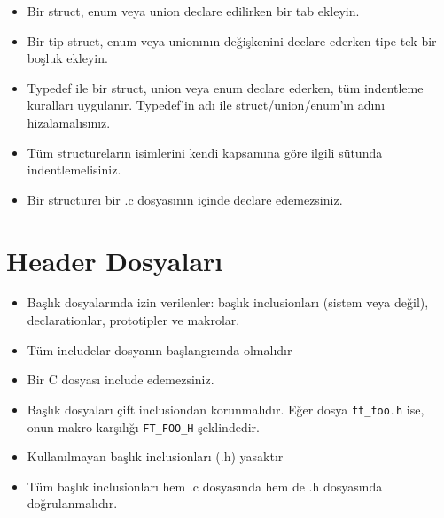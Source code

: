 \documentclass{42-en}
\begin{document}
        \begin{itemize}

            \item Bir struct, enum veya union declare edilirken bir tab ekleyin.

            \item Bir tip struct, enum veya unionının değişkenini declare ederken tipe tek bir boşluk ekleyin.

            \item Typedef ile bir struct, union veya enum declare ederken, tüm indentleme kuralları uygulanır. Typedef’in adı
ile struct/union/enum’ın adını hizalamalısınız.

            \item Tüm structureların isimlerini kendi kapsamına göre ilgili sütunda indentlemelisiniz.

            \item Bir structureı bir .c dosyasının içinde declare edemezsiniz.

        \end{itemize}
        \newpage


    \section{Header Dosyaları}

        \begin{itemize}

            \item Başlık dosyalarında izin verilenler: başlık inclusionları (sistem veya değil), declarationlar, prototipler ve
makrolar.

            \item Tüm includelar dosyanın başlangıcında olmalıdır

            \item Bir C dosyası include edemezsiniz.

            \item Başlık dosyaları çift inclusiondan korunmalıdır. Eğer dosya \texttt{ft\_foo.h} ise, onun makro karşılığı \texttt{FT\_FOO\_H}
şeklindedir.

            \item Kullanılmayan başlık inclusionları (.h) yasaktır

            \item Tüm başlık inclusionları hem .c dosyasında hem de .h dosyasında doğrulanmalıdır.

        \end{itemize}
\end{document}
